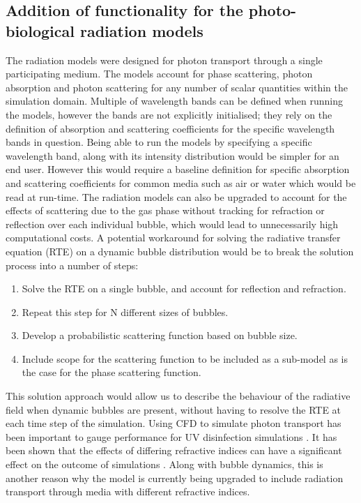 \subsection{Addition of functionality for the photo-biological radiation models}
The radiation models were designed for photon transport through a single participating medium. The models account for phase scattering, photon absorption and photon scattering for any number of scalar quantities within the simulation domain. Multiple of wavelength bands can be defined when running the models, however the bands are not explicitly initialised; they rely on the definition of absorption and scattering coefficients for the specific wavelength bands in question. Being able to run the models by specifying a specific wavelength band, along with its intensity distribution would be simpler for an end user. However this would require a baseline definition for specific absorption and scattering coefficients for common media such as air or water which would be read at run-time. 
\skippingparagraph
The radiation models can also be upgraded to account for the effects of scattering due to the gas phase without tracking for refraction or reflection over each individual bubble, which would lead to unnecessarily high computational costs. A potential workaround for solving the radiative transfer equation (RTE) on a dynamic bubble distribution would be to break the solution process into a number of steps:
\begin{enumerate}
    \item Solve the RTE on a single bubble, and account for reflection and refraction.
    \item Repeat this step for N different sizes of bubbles.
    \item Develop a probabilistic scattering function based on bubble size.
    \item Include scope for the scattering function to be included as a sub-model as is the case for the phase scattering function. 
\end{enumerate}
This solution approach would allow us to describe the behaviour of the radiative field when dynamic bubbles are present, without having to resolve the RTE at each time step of the simulation.
\skippingparagraph
Using CFD to simulate photon transport has been important to gauge performance for UV disinfection simulations \cite{crapulli2010}. It has been shown that the effects of differing refractive indices can have a significant effect on the outcome of simulations \cite{ho2009}. Along with bubble dynamics, this is another reason why the model is currently being upgraded to include radiation transport through media with different refractive indices.


